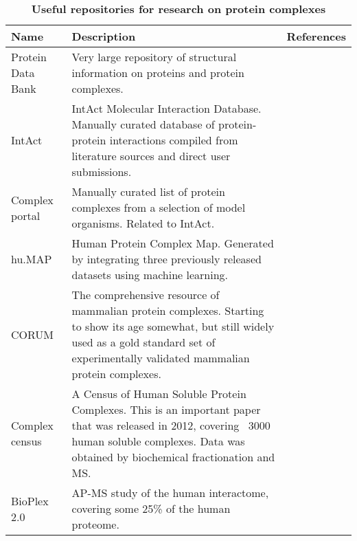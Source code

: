 \documentclass[a4paper,11pt,twoside,openright]{scrbook}
\begin{document}
\begin{table}[h]
    \captionsetup{width=0.85\linewidth}
    \caption[Useful repositories for research on protein complexes]{\sffamily
    \textbf{Useful repositories for research on protein complexes} \\ \small }
    \centering
    \onehalfspacing
    \small
    \begin{tabular}{p{2.5cm} p{8cm} l}
    \hline
    Name  & Description &   References\\[0.1cm]
    \hline
Protein Data Bank   &   Very large repository of structural information on
        proteins and protein complexes.  &   \cite{Berman2000}\\
IntAct  & IntAct Molecular Interaction Database. Manually curated database of
        protein-protein interactions compiled from literature sources and direct
        user submissions.   &   \cite{Orchard2014}\\
Complex portal  &   Manually curated list of protein complexes from a selection
        of model organisms. Related to IntAct.  &   \cite{Meldal2015}\\
hu.MAP  &   Human Protein Complex Map. Generated by integrating three previously
        released datasets using machine learning. &
        \cite{Drew2017,Wan2015,Hein2015,Huttlin2015}\\
CORUM   &   The comprehensive resource of mammalian protein complexes. Starting
        to show its age somewhat, but still widely used as a gold standard set
        of experimentally validated mammalian protein complexes.  &
        \cite{Ruepp2009}\\
Complex census  &   A Census of Human Soluble Protein Complexes. This is an
        important paper that was released in 2012, covering ~3000 human soluble
        complexes. Data was obtained by biochemical fractionation and MS.   &
        \cite{Havugimana2012}\\
BioPlex 2.0 &   AP-MS study of the human interactome, covering some 25\% of the
        human proteome. &   \cite{Huttlin2015,Huttlin2017}\\
[0.1cm]
    \hline
    \end{tabular}
    \label{table:databases}
\end{table}
\end{document}
